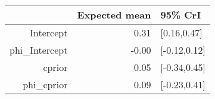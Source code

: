\begin{tabular}{rrl}
  \hline
 & Expected mean & 95\% CrI \\ 
  \hline
Intercept & 0.31 & [0.16,0.47] \\ 
  phi\_Intercept & -0.00 & [-0.12,0.12] \\ 
  cprior & 0.05 & [-0.34,0.45] \\ 
  phi\_cprior & 0.09 & [-0.23,0.41] \\ 
   \hline
\end{tabular}

